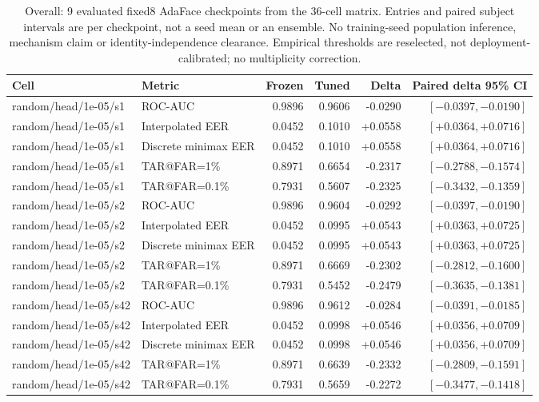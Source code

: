 \begin{table}[!t]
\caption{Overall: 9 evaluated fixed8 AdaFace checkpoints from the 36-cell matrix. Entries and paired subject intervals are per checkpoint, not a seed mean or an ensemble. No training-seed population inference, mechanism claim or identity-independence clearance. Empirical thresholds are reselected, not deployment-calibrated; no multiplicity correction.}
\label{tab:strong-fixed8-overall}
\centering\scriptsize
\begin{tabular}{@{}llrrrr@{}}
\toprule
Cell & Metric & Frozen & Tuned & Delta & Paired delta 95\% CI \\
\midrule
random/head/1e-05/s1 & ROC-AUC & 0.9896 & 0.9606 & -0.0290 & $[-0.0397,-0.0190]$ \\
random/head/1e-05/s1 & Interpolated EER & 0.0452 & 0.1010 & +0.0558 & $[+0.0364,+0.0716]$ \\
random/head/1e-05/s1 & Discrete minimax EER & 0.0452 & 0.1010 & +0.0558 & $[+0.0364,+0.0716]$ \\
random/head/1e-05/s1 & TAR@FAR=1\% & 0.8971 & 0.6654 & -0.2317 & $[-0.2788,-0.1574]$ \\
random/head/1e-05/s1 & TAR@FAR=0.1\% & 0.7931 & 0.5607 & -0.2325 & $[-0.3432,-0.1359]$ \\
random/head/1e-05/s2 & ROC-AUC & 0.9896 & 0.9604 & -0.0292 & $[-0.0397,-0.0190]$ \\
random/head/1e-05/s2 & Interpolated EER & 0.0452 & 0.0995 & +0.0543 & $[+0.0363,+0.0725]$ \\
random/head/1e-05/s2 & Discrete minimax EER & 0.0452 & 0.0995 & +0.0543 & $[+0.0363,+0.0725]$ \\
random/head/1e-05/s2 & TAR@FAR=1\% & 0.8971 & 0.6669 & -0.2302 & $[-0.2812,-0.1600]$ \\
random/head/1e-05/s2 & TAR@FAR=0.1\% & 0.7931 & 0.5452 & -0.2479 & $[-0.3635,-0.1381]$ \\
random/head/1e-05/s42 & ROC-AUC & 0.9896 & 0.9612 & -0.0284 & $[-0.0391,-0.0185]$ \\
random/head/1e-05/s42 & Interpolated EER & 0.0452 & 0.0998 & +0.0546 & $[+0.0356,+0.0709]$ \\
random/head/1e-05/s42 & Discrete minimax EER & 0.0452 & 0.0998 & +0.0546 & $[+0.0356,+0.0709]$ \\
random/head/1e-05/s42 & TAR@FAR=1\% & 0.8971 & 0.6639 & -0.2332 & $[-0.2809,-0.1591]$ \\
random/head/1e-05/s42 & TAR@FAR=0.1\% & 0.7931 & 0.5659 & -0.2272 & $[-0.3477,-0.1418]$ \\

\end{tabular}
\end{table}
